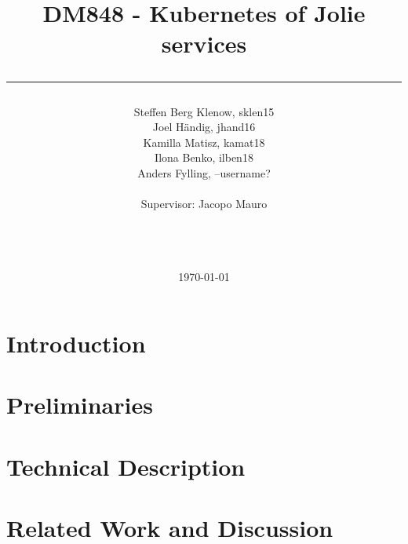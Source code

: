 \documentclass[a4paper,11pt]{article}
\title{DM848 - Kubernetes of Jolie services\\\rule{10cm}{0.5mm}}
\author{Steffen Berg Klenow, sklen15\\ Joel Händig, jhand16\\ Kamilla Matisz, kamat18\\ Ilona Benko, ilben18 \\ Anders Fylling, --username?
\\\\Supervisor: Jacopo Mauro\\\rule{5.5cm}{0.5mm}\\}
\date{\today}
\begin{document}
\clearpage\maketitle
\thispagestyle{empty}

\newpage
\clearpage\tableofcontents
\thispagestyle{empty}

\newpage
\setcounter{page}{1}

\section{Introduction}
	

\section{Preliminaries}
	

\section{Technical Description}
	
	
\section{Related Work and Discussion}
	
\end{document}
